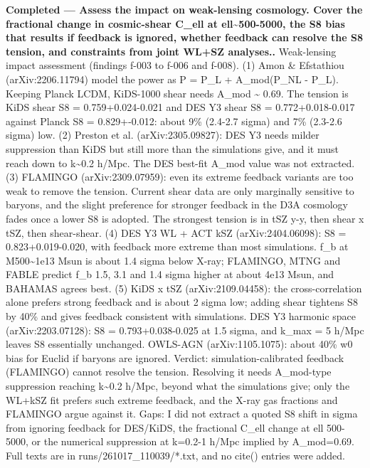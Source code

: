 \documentclass[11pt,a4paper]{article}
\begin{document}
\textbf{Completed --- Assess the impact on weak-lensing cosmology. Cover the fractional change in cosmic-shear C\_ell at ell\textasciitilde{}500-5000, the S8 bias that results if feedback is ignored, whether feedback can resolve the S8 tension, and constraints from joint WL+SZ analyses..} Weak-lensing impact assessment (findings f-003 to f-006 and f-008). (1) Amon \& Efstathiou (arXiv:2206.11794) model the power as P = P\_L + A\_mod(P\_NL - P\_L). Keeping Planck LCDM, KiDS-1000 shear needs A\_mod \textasciitilde{} 0.69. The tension is KiDS shear S8 = 0.759+0.024-0.021 and DES Y3 shear S8 = 0.772+0.018-0.017 against Planck S8 = 0.829+-0.012: about 9\% (2.4-2.7 sigma) and 7\% (2.3-2.6 sigma) low. (2) Preston et al. (arXiv:2305.09827): DES Y3 needs milder suppression than KiDS but still more than the simulations give, and it must reach down to k\textasciitilde{}0.2 h/Mpc. The DES best-fit A\_mod value was not extracted. (3) FLAMINGO (arXiv:2309.07959): even its extreme feedback variants are too weak to remove the tension. Current shear data are only marginally sensitive to baryons, and the slight preference for stronger feedback in the D3A cosmology fades once a lower S8 is adopted. The strongest tension is in tSZ y-y, then shear x tSZ, then shear-shear. (4) DES Y3 WL + ACT kSZ (arXiv:2404.06098): S8 = 0.823+0.019-0.020, with feedback more extreme than most simulations. f\_b at M500\textasciitilde{}1e13 Msun is about 1.4 sigma below X-ray; FLAMINGO, MTNG and FABLE predict f\_b 1.5, 3.1 and 1.4 sigma higher at about 4e13 Msun, and BAHAMAS agrees best. (5) KiDS x tSZ (arXiv:2109.04458): the cross-correlation alone prefers strong feedback and is about 2 sigma low; adding shear tightens S8 by 40\% and gives feedback consistent with simulations. DES Y3 harmonic space (arXiv:2203.07128): S8 = 0.793+0.038-0.025 at 1.5 sigma, and k\_max = 5 h/Mpc leaves S8 essentially unchanged. OWLS-AGN (arXiv:1105.1075): about 40\% w0 bias for Euclid if baryons are ignored. Verdict: simulation-calibrated feedback (FLAMINGO) cannot resolve the tension. Resolving it needs A\_mod-type suppression reaching k\textasciitilde{}0.2 h/Mpc, beyond what the simulations give; only the WL+kSZ fit prefers such extreme feedback, and the X-ray gas fractions and FLAMINGO argue against it. Gaps: I did not extract a quoted S8 shift in sigma from ignoring feedback for DES/KiDS, the fractional C\_ell change at ell 500-5000, or the numerical suppression at k=0.2-1 h/Mpc implied by A\_mod=0.69. Full texts are in runs/261017\_110039/*.txt, and no cite() entries were added.
\end{document}
